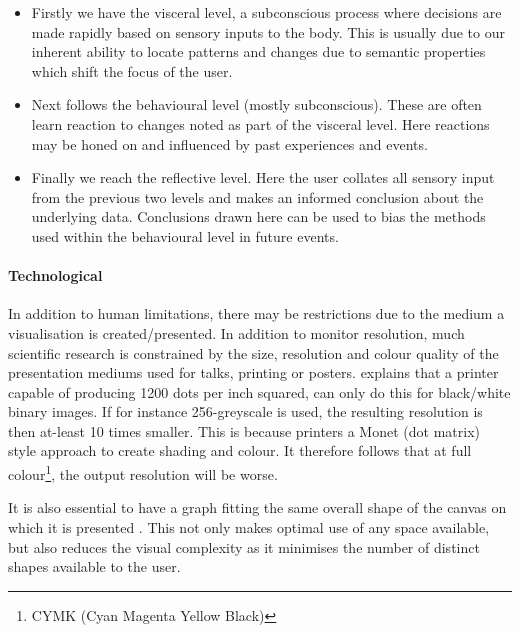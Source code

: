 \begin{itemize}
\item[1.] Firstly we have the visceral level, a subconscious process where decisions are made rapidly based on sensory inputs to the body. 
This is usually due to our inherent ability to locate patterns and changes due to semantic properties which shift the focus of the user.  

\item[2.] Next follows the behavioural level (mostly subconscious). These are often learn reaction to changes noted as part of the visceral level. Here reactions may be honed on and influenced by past experiences and events. 

\item[3.] Finally we reach the reflective level. Here the user collates all sensory input from the previous two levels and makes an informed conclusion about the underlying data. Conclusions drawn here can be used to bias the methods used within the behavioural level in future events. 
\end{itemize}

\paragraph{Technological}
In addition to human limitations, there may be restrictions due to the medium a visualisation is created/presented. In addition to monitor resolution, much scientific research is constrained by the size, resolution and colour quality of the presentation mediums used for talks, printing or posters. \cite{ware} explains that a printer capable of producing 1200 dots per inch squared, can only do this for black/white binary images. If for instance 256-greyscale is used, the resulting resolution is then at-least 10 times smaller. This is because printers a Monet (dot matrix) style approach to create shading and colour. It therefore follows that at full colour\footnote{CYMK (Cyan Magenta Yellow Black)}, the output resolution will be worse. 

It is also essential to have a graph fitting the same overall shape of the canvas on which it is presented \citep{graphmetnew}. This not only makes optimal use of any space available, but also reduces the visual complexity as it minimises the number of distinct shapes available to the user. 




 




